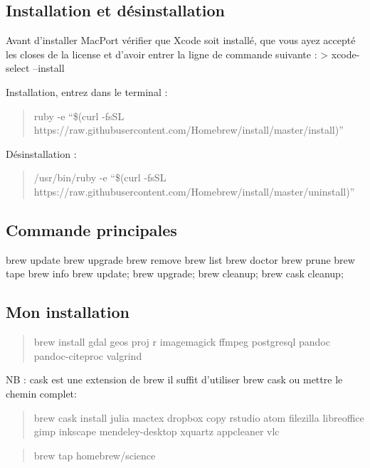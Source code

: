 \subsection{Installation et
désinstallation}\label{installation-et-duxe9sinstallation}

Avant d'installer MacPort vérifier que Xcode soit installé, que vous
ayez accepté les closes de la license et d'avoir entrer la ligne de
commande suivante : \textgreater{} xcode-select --install

Installation, entrez dans le terminal :

\begin{quote}
ruby -e ``\$(curl -fsSL
https://raw.githubusercontent.com/Homebrew/install/master/install)''
\end{quote}

Désinstallation :

\begin{quote}
/usr/bin/ruby -e ``\$(curl -fsSL
https://raw.githubusercontent.com/Homebrew/install/master/uninstall)''
\end{quote}

\subsection{Commande principales}\label{commande-principales}

brew update brew upgrade brew remove brew list brew doctor brew prune
brew tape brew info brew update; brew upgrade; brew cleanup; brew cask
cleanup;

\subsection{Mon installation}\label{mon-installation}

\begin{quote}
brew install gdal geos proj r imagemagick ffmpeg postgresql pandoc
pandoc-citeproc valgrind
\end{quote}

NB : cask est une extension de brew il suffit d'utiliser brew cask ou
mettre le chemin complet:

\begin{quote}
brew cask install julia mactex dropbox copy rstudio atom filezilla
libreoffice gimp inkscape mendeley-desktop xquartz appcleaner vlc
\end{quote}

\begin{quote}
brew tap homebrew/science
\end{quote}

